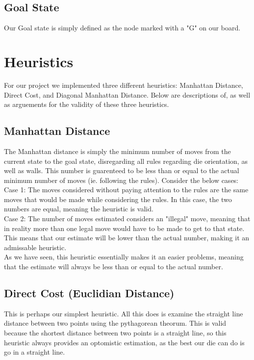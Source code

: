 \documentclass{article}
\begin{document}
\subsection*{Goal State}
Our Goal state is simply defined as the node marked with a "G" on our board.  
\section*{Heuristics}
For our project we implemented three different heuristics: Manhattan Distance, Direct Cost, and Diagonal Manhattan Distance.  Below are descriptions of, as well as arguements for the validity of these three heuristics.
\subsection*{Manhattan Distance}
The Manhattan distance is simply the minimum number of moves from the current state to the goal state, disregarding all rules regarding die orientation, as well as walls.  This number is guarenteed to be less than or equal to the actual minimum number of moves (ie. following the rules).  Consider the below cases:\\
Case 1: The moves considered without paying attention to the rules are the same moves that would be made while considering the rules.  In this case, the two numbers are equal, meaning the heuristic is valid.\\
Case 2: The number of moves estimated considers an "illegal" move, meaning that in reality more than one legal move would have to be made to get to that state.  This means that our estimate will be lower than the actual number, making it an admissable heuristic.\\
As we have seen, this heuristic essentially makes it an easier problems, meaning that the estimate will always be less than or equal to the actual number.  
\subsection*{Direct Cost (Euclidian Distance)}
This is perhaps our simplest heuristic.  All this does is examine the straight line distance between two points using the pythagorean theorum.  This is valid because the shortest distance between two points is a straight line, so this heuristic always provides an optomistic estimation, as the best our die can do is go in a straight line.
\end{document}
